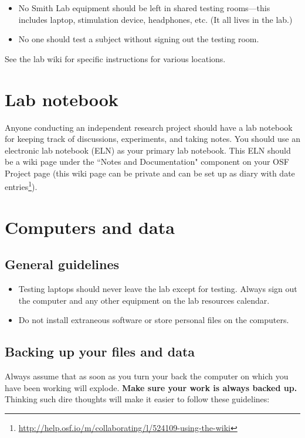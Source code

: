 \documentclass[letterpaper,12pt,oneside]{memoir}
\begin{document}
{\begin{itemize}
\item No Smith Lab equipment should be left in shared testing rooms---this includes laptop, stimulation device, headphones, etc. (It all lives in the lab.)

\item No one should test a subject without signing out the testing room.
\end{itemize}

See the lab wiki for specific instructions for various locations.



\section{Lab notebook}
\label{sec:lab_notebook}

Anyone conducting an independent research project should have a lab notebook for keeping track of discussions, experiments, and taking notes. You should use an electronic lab notebook (ELN) as your primary lab notebook. This ELN should be a wiki page under the ``Notes and Documentation" component on your OSF Project page (this wiki page can be private and can be set up as diary with date entries\footnote{\url{http://help.osf.io/m/collaborating/l/524109-using-the-wiki}}).

\section{Computers and data}

\subsection{General guidelines}

\begin{itemize}
\item Testing laptops should never leave the lab except for testing. Always sign out the computer and any other equipment on the lab resources calendar.
\item Do not install extraneous software or store personal files on the computers.
\end{itemize}

\subsection{Backing up your files and data}

Always assume that as soon as you turn your back the computer on which you have been working will explode. \textbf{Make sure your work is always backed up.} Thinking such dire thoughts will make it easier to follow these guidelines:

}
\end{document}
